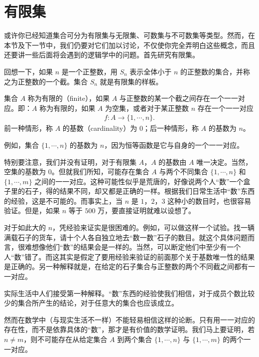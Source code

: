 \documentclass[../../main.tex]{subfiles}
\begin{document}
\section{有限集}\label{section:ch01-有限集}

或许你已经知道集合可分为有限集与无限集、可数集与不可数集等类型。然而，在本节及下一节中，我们仍要对它们加以讨论，不仅使你完全弄明白这些概念，而且还要讲一些后面将会遇到的逻辑学中的问题。首先研究有限集。

回想一下，如果 $n$ 是一个正整数，用 $S_{n}$ 表示全体小于 $n$ 的正整数的集合，并称之为正整数的一个截。集合 $S_{n}$ 就是有限集的样板。

\begin{definition}[有限集与基数]\label{definition:ch01-有限集}
集合 $A$ 称为有限的（finite），如果 $A$ 与正整数的某一个截之间存在一个一一对应。即：$A$ 称为有限的，如果 $A$ 为空集，或者对于某正整数 $n$ 存在一个一一对应
\begin{align*}
f: A \longrightarrow \{1, \cdots, n\}.
\end{align*}
前一种情形，称 $A$ 的基数（cardinality）为 $0$；后一种情形，称 $A$ 的基数为 $n$。
\end{definition}

例如，集合 $\{1, \cdots, n\}$ 的基数为 $n$，因为恒等函数是它与自身的一个一一对应。

特别要注意，我们并没有证明，对于有限集 $A$，$A$ 的基数由 $A$ 唯一决定。当然，空集的基数为 $0$。但就我们所知，可能存在集合 $A$ 与两个不同集合 $\{1, \cdots, n\}$ 和 $\{1, \cdots, m\}$ 之间的一一对应。这种可能性似乎是荒唐的，好像说两个人“数”一个盒子里的石子，得的结果不同，却又都是正确的一样。根据我们日常生活中“数”东西的经验，这是不可能的。而事实上，当 $n$ 是 $1$，$2$，$3$ 这种小的数目时，也很容易验证。但是，如果 $n$ 等于 $500$ 万，要直接证明就难以设想了。

对于如此大的 $n$，凭经验来证实是很困难的。例如，可以做这样一个试验。找一辆满载石子的货车，请十个人各自独立地去“数一数”石子的数目。就这个具体问题而言，很难想像他们“数”的结果会是一样的。当然，可以断定他们中至少有一个人“数”错了。而这其实是假定了要用经验来验证的前面那个关于基数唯一性的结果是正确的。另一种解释就是，在给定的石子集合与正整数的两个不同截之间都有一一对应。

实际生活中人们接受第一种解释。“数”东西的经验使我们相信，对于成员个数比较少的集合所产生的结论，对于任意大的集合也应该成立。

然而在数学中（与现实生活不一样）不能轻易相信这样的论断。只有用一一对应的存在性，而不是依靠具体的“数”，那才是有价值的数学证明。我们马上要证明，若 $n \neq m$，则不可能存在从给定集合 $A$ 到两个集合 $\{1, \cdots, n\}$ 与 $\{1, \cdots, m\}$ 的两个一一对应。
\end{document}
